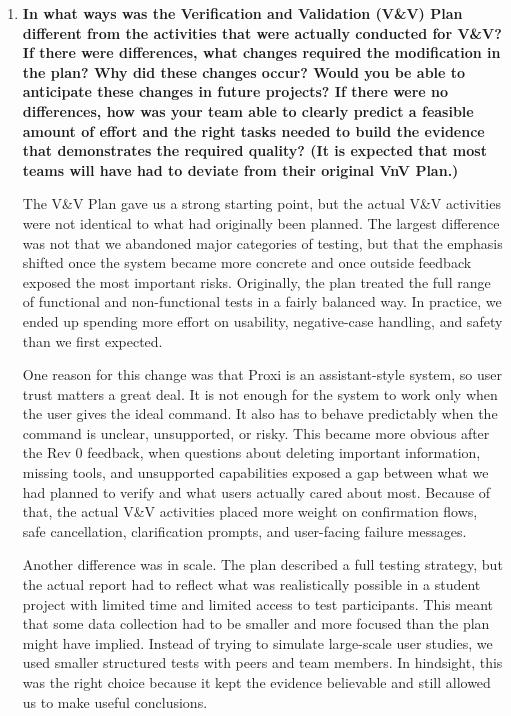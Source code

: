 \documentclass[12pt]{article}
\begin{document}
\begin{enumerate}
Similarly, some parts of the compliance and documentation-oriented
sections did not come directly from proxy feedback. Those parts were
included because they are necessary for a complete engineering
deliverable and because they demonstrate discipline in documentation and
release quality. In other words, those sections were driven less by user
opinion and more by the expectations of the course, the template, and
good software engineering practice.

\bigskip
\item \textbf{In what ways was the Verification and Validation
(V\&V) Plan different from the activities that were actually conducted
for V\&V? If there were differences, what changes required the
modification in the plan? Why did these changes occur? Would you be
able to anticipate these changes in future projects? If there were no
differences, how was your team able to clearly predict a feasible
amount of effort and the right tasks needed to build the evidence that
demonstrates the required quality? (It is expected that most teams
will have had to deviate from their original VnV Plan.)}

The V\&V Plan gave us a strong starting point, but the actual V\&V
activities were not identical to what had originally been planned. The
largest difference was not that we abandoned major categories of
testing, but that the emphasis shifted once the system became more
concrete and once outside feedback exposed the most important risks.
Originally, the plan treated the full range of functional and
non-functional tests in a fairly balanced way. In practice, we ended up
spending more effort on usability, negative-case handling, and safety
than we first expected.

One reason for this change was that Proxi is an assistant-style system,
so user trust matters a great deal. It is not enough for the system to
work only when the user gives the ideal command. It also has to behave
predictably when the command is unclear, unsupported, or risky. This
became more obvious after the Rev 0 feedback, when questions about
deleting important information, missing tools, and unsupported
capabilities exposed a gap between what we had planned to verify and
what users actually cared about most. Because of that, the actual V\&V
activities placed more weight on confirmation flows, safe cancellation,
clarification prompts, and user-facing failure messages.

Another difference was in scale. The plan described a full testing
strategy, but the actual report had to reflect what was realistically
possible in a student project with limited time and limited access to
test participants. This meant that some data collection had to be
smaller and more focused than the plan might have implied. Instead of
trying to simulate large-scale user studies, we used smaller structured
tests with peers and team members. In hindsight, this was the right
choice because it kept the evidence believable and still allowed us to
make useful conclusions.


\end{enumerate}
\end{document}

